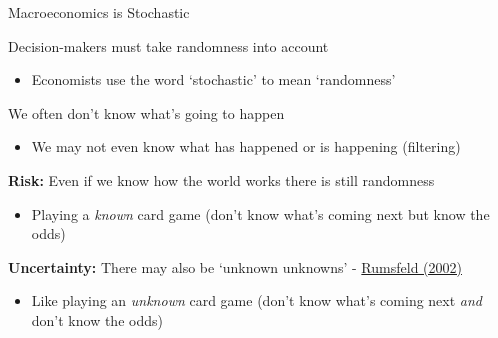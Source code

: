 
\begin{frame}{Macroeconomics is Stochastic}

Decision-makers must take randomness into account
\begin{itemize}
\item	Economists use the word `stochastic' to mean `randomness'
\end{itemize}
\vspace{2mm}	
We often don't know what's going to happen
\begin{itemize}
\item	We may not even know what has happened or is happening (filtering)
\end{itemize}
\vspace{2mm}
\textbf{Risk:} Even if we know how the world works there is still randomness
\begin{itemize}
\item	Playing a \textit{known} card game (don't know what's coming next but know the odds)
\end{itemize}
\vspace{2mm}
\textbf{Uncertainty:} There may also be `unknown unknowns' - \href{https://en.wikipedia.org/wiki/There_are_known_knowns}{Rumsfeld (2002)}
\begin{itemize}
\item	Like playing an \textit{unknown} card game (don't know what's coming next \textit{and} don't know the odds)
\end{itemize}

\end{frame}



